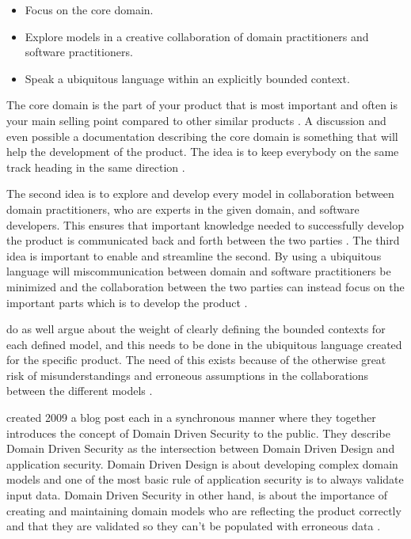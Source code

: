 \begin{itemize}
  \item Focus on the core domain.
  \item Explore models in a creative collaboration of domain practitioners and software practitioners.
  \item Speak a ubiquitous language within an explicitly bounded context.
\end{itemize}

The core domain is the part of your product that is most important and often is your main selling point compared to other similar products \parencite{millett_2015}. A discussion and even possible a documentation describing the core domain is something that will help the development of the product. The idea is to keep everybody on the same track heading in the same direction \parencite{EvansEric2004Dd:t}.

The second idea is to explore and develop every model in collaboration between domain practitioners, who are experts in the given domain, and software developers. This ensures that important knowledge needed to successfully develop the product is communicated back and forth between the two parties \parencite{millett_2015}. The third idea is important to enable and streamline the second. By using a ubiquitous language will miscommunication between domain and software practitioners be minimized and the collaboration between the two parties can instead focus on the important parts which is to develop the product \parencite{evans_2015}.

\textcite{evans_2015} do as well argue about the weight of clearly defining the bounded contexts for each defined model, and this needs to be done in the ubiquitous language created for the specific product. The need of this exists because of the otherwise great risk of misunderstandings and erroneous assumptions in the collaborations between the different models \parencite{millett_2015}.

\textcite{Wilander2009, Johnsson2009} created 2009 a blog post each in a synchronous manner where they together introduces the concept of Domain Driven Security to the public. They describe Domain Driven Security as the intersection between Domain Driven Design and application security. Domain Driven Design is about developing complex domain models and one of the most basic rule of application security is to always validate input data. Domain Driven Security in other hand, is about the importance of creating and maintaining domain models who are reflecting the product correctly and that they are validated so they can't be populated with erroneous data \parencite{Wilander2009, Johnsson2009, Arnor2016, Stendahl2016}.


